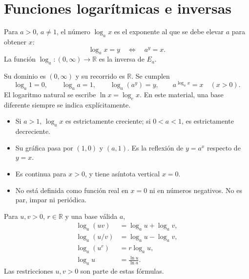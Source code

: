 \documentclass[10pt,a5paper]{article}
\begin{document}
\section*{Funciones logarítmicas e inversas}

\begin{definicion}[logaritmo]
Para $a>0$, $a\neq1$, el número $\log_a x$ es el exponente al que se debe elevar $a$ para obtener $x$:
\[
  \log_a x=y\quad\Longleftrightarrow\quad a^y=x.
\]
La función $\log_a\colon(0,\infty)\to\mathbb{R}$ es la inversa de $E_a$.
\end{definicion}

Su dominio es $(0,\infty)$ y su recorrido es $\mathbb{R}$. Se cumplen
\[
  \log_a1=0,\qquad\log_a a=1,\qquad
  \log_a(a^y)=y,\qquad a^{\log_a x}=x\quad(x>0).
\]
El logaritmo natural se escribe $\ln x=\log_e x$. En este material, una base diferente siempre se indica explícitamente.

\begin{itemize}
  \item Si $a>1$, $\log_a x$ es estrictamente creciente; si $0<a<1$, es estrictamente decreciente.
  \item Su gráfica pasa por $(1,0)$ y $(a,1)$. Es la reflexión de $y=a^x$ respecto de $y=x$.
  \item Es continua para $x>0$, y tiene asíntota vertical $x=0$.
  \item No está definida como función real en $x=0$ ni en números negativos. No es par, impar ni periódica.
\end{itemize}

\begin{center}
\end{center}

\begin{proposicion}
Para $u,v>0$, $r\in\mathbb{R}$ y una base válida $a$,
\begin{align*}
  \log_a(uv)&=\log_a u+\log_a v,\\
  \log_a(u/v)&=\log_a u-\log_a v,\\
  \log_a(u^r)&=r\log_a u,\\
  \log_a u&=\frac{\ln u}{\ln a}.
\end{align*}
Las restricciones $u,v>0$ son parte de estas fórmulas.
\end{proposicion}
\end{document}
